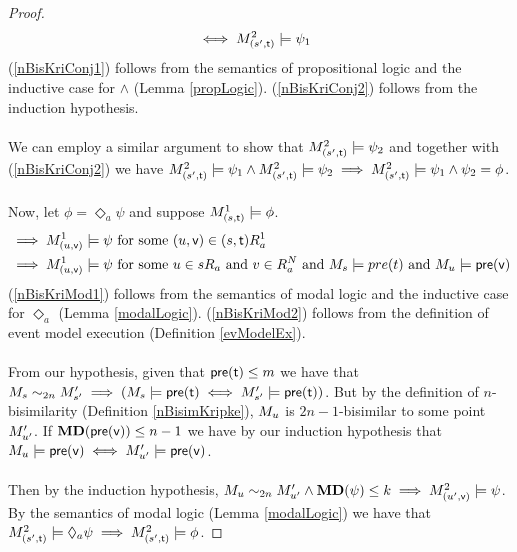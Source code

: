 \begin{proof}
\begin{align}
	& \iff M^2_{(s',\mathrm{\mathsf{t}})} \models \psi_1 \label{nBisKriConj2}
\end{align}
(\ref{nBisKriConj1}) follows from the semantics of propositional logic and the inductive case for
$\land$ (Lemma \ref{propLogic}).
(\ref{nBisKriConj2}) follows from the induction hypothesis.\\
\\
We can employ a similar argument to show that $M^2_{(s',\mathrm{\mathsf{t}})} \models \psi_2$ and together with
(\ref{nBisKriConj2}) we have $M^2_{(s',\mathrm{\mathsf{t}})} \models \psi_1 \land M^2_{(s',\mathrm{\mathsf{t}})} \models \psi_2 \implies
M^2_{(s',\mathrm{\mathsf{t}})} \models \psi_1 \land \psi_2 = \phi$.\\
\\
Now, let $\phi = \Diamond_a \psi$ and suppose $M^1_{(s,\mathrm{\mathsf{t}})} \models \phi$.
\begin{align}
	& \implies M^1_{(u,\mathrm{\mathsf{v}})} \models \psi \text{ for some $(u,\mathrm{\mathsf{v}}) \in (s,\mathrm{\mathsf{t}}) R^1_a$} \label{nBisKriMod1} \\
	& \implies M^1_{(u,\mathrm{\mathsf{v}})} \models \psi \text{ for some $u \in s R_a$ and $v \in R^N_a$ and $M_s
		\models pre(t)$ and $M_u \models \mathrm{\mathsf{pre(v)}}$} \label{nBisKriMod2}
\end{align}
(\ref{nBisKriMod1}) follows from the semantics of modal logic and the inductive case for
$\Diamond_a$ (Lemma \ref{modalLogic}).
(\ref{nBisKriMod2}) follows from the definition of event model execution (Definition
		\ref{evModelEx}).\\
\\
From our hypothesis, given that $\mathrm{\mathsf{pre(t)}} \leq m$ we have that $M_s \sim_{2n} M'_{s'}
\implies (M_s \models \mathrm{\mathsf{pre(t)}} \iff M'_{s'} \models
\mathrm{\mathsf{pre(t)}})$.
But by the definition of $n$-bisimilarity (Definition \ref{nBisimKripke}), $M_u$ is
$2n-1$-bisimilar to some point $M'_{u'}$.
If ${\bf MD}(\mathrm{\mathsf{pre(v)}}) \leq n-1$ we have by our induction hypothesis that $M_u \models
\mathrm{\mathsf{pre(v)}} \iff M'_{u'}
\models \mathrm{\mathsf{pre(v)}}$.\\
\\
Then by the induction hypothesis, $M_u \sim_{2n} M'_{u'} \land {\bf MD}(\psi) \leq k \implies
M^2_{(u',\mathrm{\mathsf{v}})}  \models \psi$.
By the semantics of modal logic (Lemma \ref{modalLogic}) we have that $M^2_{(s',\mathrm{\mathsf{t}})} \models
\Diamond_a \psi \implies M^2_{(s',\mathrm{\mathsf{t}})} \models \phi$.
\end{proof}

